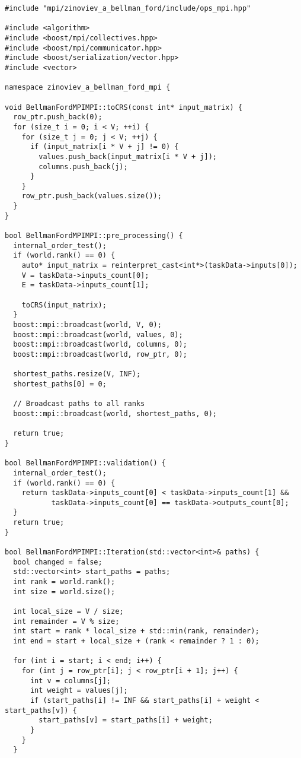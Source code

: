 \documentclass[12pt]{article}
\begin{document}
\newpage

\begin{lstlisting}[caption={ops\_mpi\_.cpp}]
#include "mpi/zinoviev_a_bellman_ford/include/ops_mpi.hpp"

#include <algorithm>
#include <boost/mpi/collectives.hpp>
#include <boost/mpi/communicator.hpp>
#include <boost/serialization/vector.hpp>
#include <vector>

namespace zinoviev_a_bellman_ford_mpi {

void BellmanFordMPIMPI::toCRS(const int* input_matrix) {
  row_ptr.push_back(0);
  for (size_t i = 0; i < V; ++i) {
    for (size_t j = 0; j < V; ++j) {
      if (input_matrix[i * V + j] != 0) {
        values.push_back(input_matrix[i * V + j]);
        columns.push_back(j);
      }
    }
    row_ptr.push_back(values.size());
  }
}

bool BellmanFordMPIMPI::pre_processing() {
  internal_order_test();
  if (world.rank() == 0) {
    auto* input_matrix = reinterpret_cast<int*>(taskData->inputs[0]);
    V = taskData->inputs_count[0];
    E = taskData->inputs_count[1];

    toCRS(input_matrix);
  }
  boost::mpi::broadcast(world, V, 0);
  boost::mpi::broadcast(world, values, 0);
  boost::mpi::broadcast(world, columns, 0);
  boost::mpi::broadcast(world, row_ptr, 0);

  shortest_paths.resize(V, INF);
  shortest_paths[0] = 0;

  // Broadcast paths to all ranks
  boost::mpi::broadcast(world, shortest_paths, 0);

  return true;
}

bool BellmanFordMPIMPI::validation() {
  internal_order_test();
  if (world.rank() == 0) {
    return taskData->inputs_count[0] < taskData->inputs_count[1] &&
           taskData->inputs_count[0] == taskData->outputs_count[0];
  }
  return true;
}

bool BellmanFordMPIMPI::Iteration(std::vector<int>& paths) {
  bool changed = false;
  std::vector<int> start_paths = paths;
  int rank = world.rank();
  int size = world.size();

  int local_size = V / size;
  int remainder = V % size;
  int start = rank * local_size + std::min(rank, remainder);
  int end = start + local_size + (rank < remainder ? 1 : 0);

  for (int i = start; i < end; i++) {
    for (int j = row_ptr[i]; j < row_ptr[i + 1]; j++) {
      int v = columns[j];
      int weight = values[j];
      if (start_paths[i] != INF && start_paths[i] + weight < start_paths[v]) {
        start_paths[v] = start_paths[i] + weight;
      }
    }
  }


\end{lstlisting}
\end{document}
